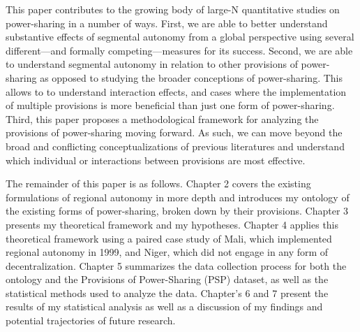 \documentclass[12pt]{article}
\begin{document}
This paper contributes to the growing body of large-N quantitative studies on power-sharing in a number of ways. First, we are able to better understand substantive effects of segmental autonomy from a global perspective using several different---and formally competing---measures for its success. Second, we are able to understand segmental autonomy in relation to other provisions of power-sharing as opposed to studying the broader conceptions of power-sharing. This allows to to understand interaction effects, and cases where the implementation of multiple provisions is more beneficial than just one form of power-sharing. Third, this paper proposes a methodological framework for analyzing the provisions of power-sharing moving forward. As such, we can move beyond the broad and conflicting conceptualizations of previous literatures and understand which individual or interactions between provisions are most effective. 

The remainder of this paper is as follows. Chapter 2 covers the existing formulations of regional autonomy in more depth and introduces my ontology of the existing forms of power-sharing, broken down by their provisions. Chapter 3 presents my theoretical framework and my hypotheses. Chapter 4 applies this theoretical framework using a paired case study of Mali, which implemented regional autonomy in 1999, and Niger, which did not engage in any form of decentralization. Chapter 5 summarizes the data collection process for both the ontology and the Provisions of Power-Sharing (PSP) dataset, as well as the statistical methods used to analyze the data. Chapter's 6 and 7 present the results of my statistical analysis as well as a discussion of my findings and potential trajectories of future research. 
\end{document}
